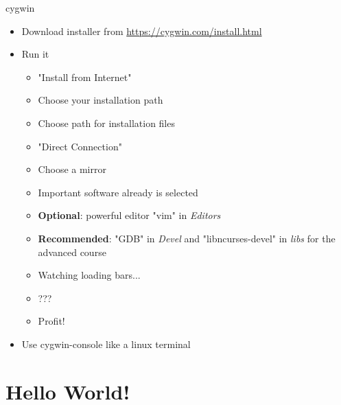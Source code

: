 \begin{frame}{cygwin}
	\begin{itemize}
		\item Download installer from \url{https://cygwin.com/install.html}
		\item Run it
		\begin{itemize}
			\item "Install from Internet"
			\item Choose your installation path
			\item Choose path for installation files
			\item "Direct Connection"
			\item Choose a mirror
			\item Important software already is selected
			\item \textbf{Optional}: powerful editor "vim" in \textit{Editors}
			\item \textbf{Recommended}: "GDB" in \textit{Devel} and "libncurses-devel" in \textit{libs} for the advanced course
			\item Watching loading bars...
			\item ???
			\item Profit!
		\end{itemize}
		\item Use cygwin-console like a linux terminal
	\end{itemize}
\end{frame}
\section{Hello World!}
